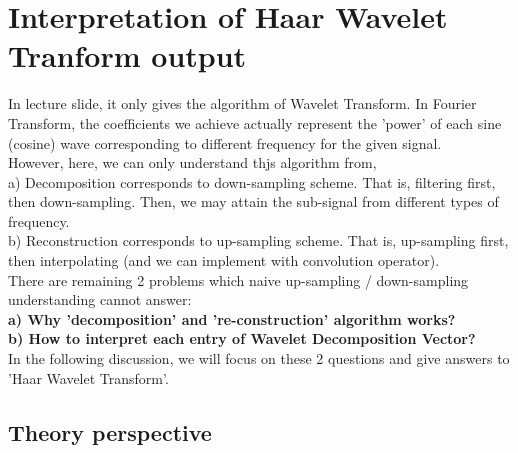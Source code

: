 \documentclass{article}
\begin{document}
\section{Interpretation of Haar Wavelet Tranform output}
In lecture slide, it only gives the algorithm of Wavelet Transform. In Fourier Transform, the coefficients we achieve actually represent the 'power' of each sine (cosine) wave corresponding to different frequency for the given signal.
\vspace{4pt}
\\
However, here, we can only understand thjs algorithm from,
\vspace{4pt}
\\
a) Decomposition corresponds to down-sampling scheme. That is, filtering first, then down-sampling. Then, we may attain the sub-signal from different types of frequency.
\\
b) Reconstruction corresponds to up-sampling scheme. That is, up-sampling first, then interpolating (and we can implement with convolution operator).
\vspace{4pt}
\\
There are remaining 2 problems which naive up-sampling / down-sampling understanding cannot answer:
\vspace{4pt}
\\
\textbf{a) Why 'decomposition' and  're-construction' algorithm works?}
\\
\textbf{b) How to interpret each entry of Wavelet Decomposition Vector?}
\vspace{4pt}
\\
In the following discussion, we will focus on these 2 questions and give answers to 'Haar Wavelet Transform'.
\subsection{Theory perspective}
\end{document}
